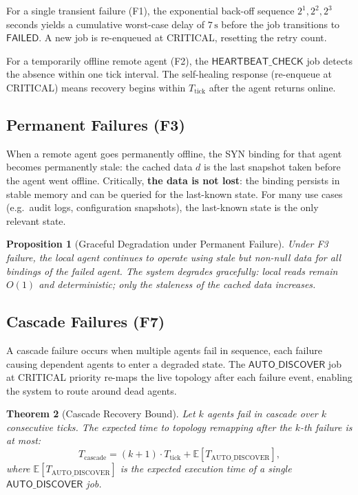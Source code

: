 \documentclass[12pt]{article}
\newtheorem{theorem}{Theorem}
\newtheorem{proposition}[theorem]{Proposition}
\begin{document}
For a single transient failure (F1), the exponential back-off sequence
$2^1, 2^2, 2^3$ seconds yields a cumulative worst-case delay of $7\,\text{s}$
before the job transitions to $\mathsf{FAILED}$.  A new job is re-enqueued
at CRITICAL, resetting the retry count.

For a temporarily offline remote agent (F2), the $\mathsf{HEARTBEAT\_CHECK}$
job detects the absence within one tick interval.  The self-healing response
(re-enqueue at CRITICAL) means recovery begins within $T_\text{tick}$ after
the agent returns online.

\subsection{Permanent Failures (F3)}

When a remote agent goes permanently offline, the SYN binding for that agent
becomes permanently stale: the cached data $d$ is the last snapshot taken
before the agent went offline.  Critically, \textbf{the data is not lost}: the
binding persists in stable memory and can be queried for the last-known state.
For many use cases (e.g.\ audit logs, configuration snapshots), the last-known
state is the only relevant state.

\begin{proposition}[Graceful Degradation under Permanent Failure]
  Under F3 failure, the local agent continues to operate using stale but
  non-null data for all bindings of the failed agent.  The system degrades
  gracefully: local reads remain $O(1)$ and deterministic; only the staleness
  of the cached data increases.
\end{proposition}

\subsection{Cascade Failures (F7)}

A cascade failure occurs when multiple agents fail in sequence, each failure
causing dependent agents to enter a degraded state.  The $\mathsf{AUTO\_DISCOVER}$
job at CRITICAL priority re-maps the live topology after each failure event,
enabling the system to route around dead agents.

\begin{theorem}[Cascade Recovery Bound]
  Let $k$ agents fail in cascade over $k$ consecutive ticks.
  The expected time to topology remapping after the $k$-th failure is at most:
  \[
    T_\text{cascade} = (k+1) \cdot T_\text{tick} + \mathbb{E}[T_\text{AUTO\_DISCOVER}],
  \]
  where $\mathbb{E}[T_\text{AUTO\_DISCOVER}]$ is the expected execution time of
  a single $\mathsf{AUTO\_DISCOVER}$ job.
\end{theorem}
\end{document}
